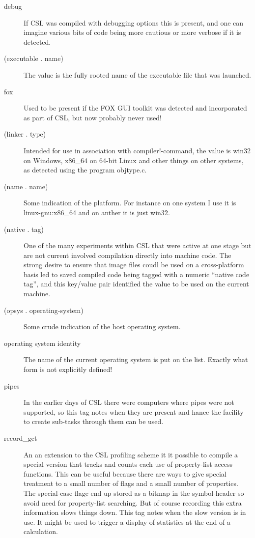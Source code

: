 \documentclass[a4paper,11pt]{article}
\begin{document}
\begin{description}
\item[{\ttfamily debug}]
If CSL was compiled with debugging options this is present, and one can imagine
various bits of code being more cautious or more verbose if it is detected.

\item[{\ttfamily  (executable . name)}]
The value is the fully rooted name of the executable file that was launched.

\item[{\ttfamily fox}]
Used to be present if the FOX GUI toolkit was detected and incorporated as
part of CSL, but now probably never used!

\item[{\ttfamily (linker . type)}]
Intended for use in association with {\ttfamily compiler!-command}, the value
is {\ttfamily win32} on Windows, {\ttfamily x86\_64} on 64-bit Linux and
other things on other systems, as detected using the program {\ttfamily
objtype.c}.

\item[{\ttfamily  (name . name)}]
Some indication of the platform. For instance on one system I use it
is {\ttfamily linux-gnu:x86\_64} and on anther it is just {\ttfamily win32}.

\item[{\ttfamily  (native . tag)}]
One of the many experiments within CSL that were active at one stage but are
not current involved compilation directly into machine code. The strong
desire to ensure that image files coudl be used on a cross-platform basis
led to saved compiled code being tagged with a numeric ``native code tag'',
and this key/value pair identified the value to be used on the current
machine.

\item[{\ttfamily  (opsys . operating-system)}]
Some crude indication of the host operating system.

\item [operating system identity]
The name of the current operating system is put on the list. Exactly what
form is not explicitly defined!

\item[{\ttfamily pipes}]
In the earlier days of CSL there were computers where pipes were not
supported, so this tag notes when they are present and hance the facility
to create sub-tasks through them can be used.

\item[{\ttfamily  record\_get}]
An an extension to the CSL profiling scheme it it possible to compile
a special version that tracks and counts each use of property-list access
functions. This can be useful because there are ways to give special
treatment to a small number of flags and a small number of properties. The
special-case flage end up stored as a bitmap in the symbol-header so avoid
need for property-list searching. But of course recording this extra
information slows things down. This tag notes when the slow version is
in use. It might be used to trigger a display of statistics at the end of
a calculation.


\end{description}
\end{document}
